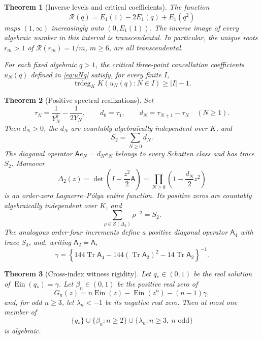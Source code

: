\documentclass[11pt]{article}
\newtheorem{theorem}{Theorem}[section]
\theoremstyle{definition}
\theoremstyle{remark}
\newcommand{\Ein}{\operatorname{Ein}}
\newcommand{\trdeg}{\operatorname{trdeg}}
\newcommand{\Tr}{\operatorname{Tr}}
\begin{document}
\begin{theorem}[Inverse levels and critical coefficients]
\label{thm:intro-inverse}
The function
\[
 \mathscr R(q)=E_1(1)-2E_1(q)+E_1(q^2)
\]
maps \((1,\infty)\) increasingly onto \((0,E_1(1))\).  The inverse image of
every algebraic number in this interval is transcendental.  In particular,
the unique roots \(r_m>1\) of \(\mathscr R(r_m)=1/m\), \(m\ge6\), are all
transcendental.

For each fixed algebraic \(q>1\), the critical three-point cancellation
coefficients \(u_N(q)\) defined in \eqref{eq:uNq} satisfy, for every finite
\(I\),
\[
 \trdeg_KK(u_N(q):N\in I)\ge |I|-1.
\]
\end{theorem}

\begin{theorem}[Positive spectral realizations]
\label{thm:intro-positive}
Set
\[
 \tau_N=\frac1{Y_N^2}-\frac1{2Y_N},\qquad
 d_0=\tau_1,\qquad d_N=\tau_{N+1}-\tau_N\quad(N\ge1).
\]
Then \(d_N>0\), the \(d_N\) are countably algebraically independent over
\(K\), and
\[
 S_2=\sum_{N\ge0}d_N.
\]
The diagonal operator \(\mathsf A e_N=d_Ne_N\) belongs to every Schatten
class and has trace \(S_2\).  Moreover
\[
 \Delta_2(z)=\det\!\left(I-\frac{z^2}{2}\mathsf A\right)
 =\prod_{N\ge0}\left(1-\frac{d_N}{2}z^2\right)
\]
is an order-zero Laguerre--P\'olya entire function.  Its positive zeros are
countably algebraically independent over \(K\), and
\[
 \sum_{\rho\in Z(\Delta_2)}\rho^{-2}=S_2.
\]
The analogous order-four increments define a positive diagonal operator
\(\mathsf A_4\) with trace \(S_4\), and, writing
\(\mathsf A_2=\mathsf A\),
\[
 \gamma=
 \left\{144\Tr\mathsf A_4
 -144(\Tr\mathsf A_2)^2-14\Tr\mathsf A_2\right\}^{-1}.
\]
\end{theorem}

\begin{theorem}[Cross-index witness rigidity]
\label{thm:intro-witness}
Let \(q_*\in(0,1)\) be the real solution of \(\Ein(q_*)=\gamma\).  Let
\(\beta_n\in(0,1)\) be the positive real zero of
\[
 G_n(z)=n\Ein(z)-\Ein(z^n)-(n-1)\gamma,
\]
and, for odd \(n\ge3\), let \(\lambda_n<-1\) be its negative real zero.
Then at most one member of
\[
 \{q_*\}\cup\{\beta_n:n\ge2\}
 \cup\{\lambda_n:n\ge3,\ n\text{ odd}\}
\]
is algebraic.
\end{theorem}
\end{document}
